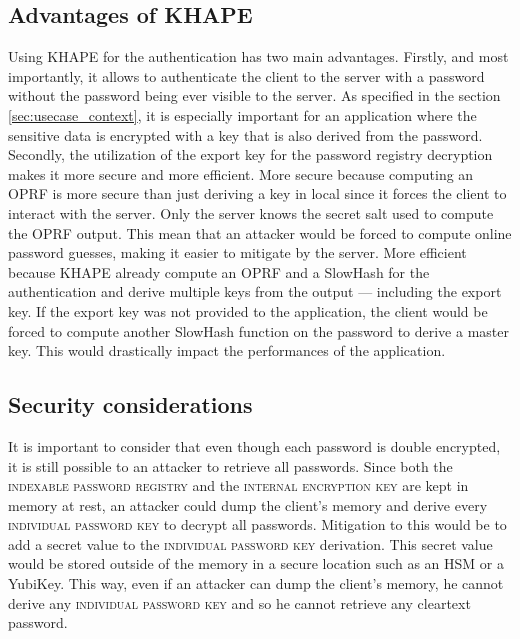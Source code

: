 \documentclass[../report.tex]{subfiles}
\begin{document}
\subsection{Advantages of KHAPE}
Using KHAPE for the authentication has two main advantages.
Firstly, and most importantly, it allows to authenticate the client to the server with a password without the password being ever visible to the server. As specified in the  section \ref{sec:usecase_context}, it is especially important for an application where the sensitive data is encrypted with a key that is also derived from the password.
Secondly, the utilization of the export key for the password registry decryption makes it more secure and more efficient.
More secure because computing an OPRF is more secure than just deriving a key in local since it forces the client to interact with the server. Only the server knows the secret salt used to compute the OPRF output. 
This mean that an attacker would be forced to compute online password guesses, making it easier to mitigate by the server.
More efficient because KHAPE already compute an OPRF and a SlowHash for the authentication and derive multiple keys from the output --- including the export key.
If the export key was not provided to the application, the client would be forced to compute another SlowHash function on the password to derive a master key. This would drastically impact the performances of the application.


\subsection{Security considerations}
It is important to consider that even though each password is double encrypted, it is still possible to an attacker to retrieve all passwords. Since both the \textsc{indexable password registry} and the \textsc{internal encryption key} are kept in memory at rest, an attacker could dump the client's memory and derive every \textsc{individual password key} to decrypt all passwords.
Mitigation to this would be to add a secret value to the \textsc{individual password key} derivation. This secret value would be stored outside of the memory in a secure location such as an HSM or a YubiKey. This way, even if an attacker can dump the client's memory, he cannot derive any \textsc{individual password key} and so he cannot retrieve any cleartext password. 

% 
% 
% 
\end{document}

